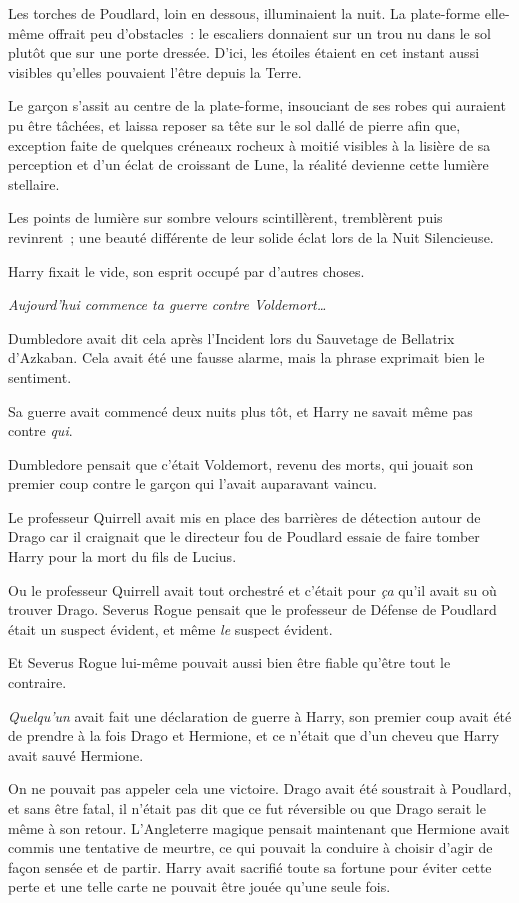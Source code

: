 Les torches de Poudlard, loin en dessous, illuminaient la nuit. La plate-forme elle-même offrait peu d'obstacles~: le escaliers donnaient sur un trou nu dans le sol plutôt que sur une porte dressée. D'ici, les étoiles étaient en cet instant aussi visibles qu'elles pouvaient l'être depuis la Terre.

Le garçon s'assit au centre de la plate-forme, insouciant de ses robes qui auraient pu être tâchées, et laissa reposer sa tête sur le sol dallé de pierre afin que, exception faite de quelques créneaux rocheux à moitié visibles à la lisière de sa perception et d'un éclat de croissant de Lune, la réalité devienne cette lumière stellaire.

Les points de lumière sur sombre velours scintillèrent, tremblèrent puis revinrent~; une beauté différente de leur solide éclat lors de la Nuit Silencieuse.

Harry fixait le vide, son esprit occupé par d'autres choses.

\emph{Aujourd'hui commence ta guerre contre Voldemort…}

Dumbledore avait dit cela après l'Incident lors du Sauvetage de Bellatrix d'Azkaban. Cela avait été une fausse alarme, mais la phrase exprimait bien le sentiment.

Sa guerre avait commencé deux nuits plus tôt, et Harry ne savait même pas contre \emph{qui}.

Dumbledore pensait que c'était Voldemort, revenu des morts, qui jouait son premier coup contre le garçon qui l'avait auparavant vaincu.

Le professeur Quirrell avait mis en place des barrières de détection autour de Drago car il craignait que le directeur fou de Poudlard essaie de faire tomber Harry pour la mort du fils de Lucius.

Ou le professeur Quirrell avait tout orchestré et c'était pour \emph{ça} qu'il avait su où trouver Drago. Severus Rogue pensait que le professeur de Défense de Poudlard était un suspect évident, et même \emph{le} suspect évident.

Et Severus Rogue lui-même pouvait aussi bien être fiable qu'être tout le contraire.

\emph{Quelqu'un} avait fait une déclaration de guerre à Harry, son premier coup avait été de prendre à la fois Drago et Hermione, et ce n'était que d'un cheveu que Harry avait sauvé Hermione.

On ne pouvait pas appeler cela une victoire. Drago avait été soustrait à Poudlard, et sans être fatal, il n'était pas dit que ce fut réversible ou que Drago serait le même à son retour. L'Angleterre magique pensait maintenant que Hermione avait commis une tentative de meurtre, ce qui pouvait la conduire à choisir d'agir de façon sensée et de partir. Harry avait sacrifié toute sa fortune pour éviter cette perte et une telle carte ne pouvait être jouée qu'une seule fois.

